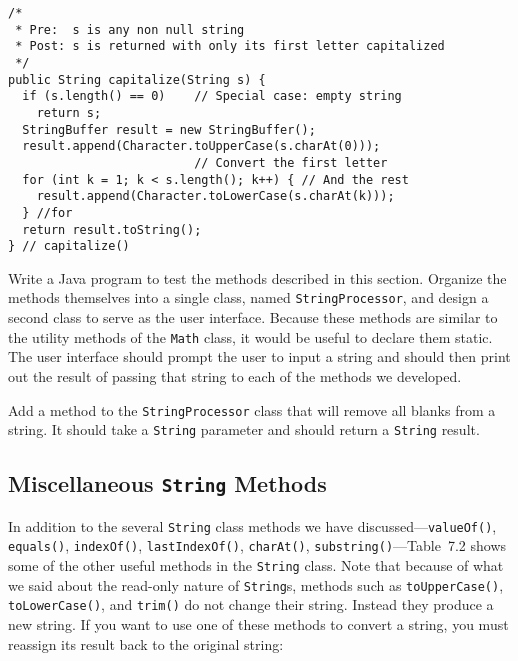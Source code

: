 \begin{jjjlisting}[27pc]
\begin{lstlisting}
/*
 * Pre:  s is any non null string
 * Post: s is returned with only its first letter capitalized
 */
public String capitalize(String s) {
  if (s.length() == 0)    // Special case: empty string
    return s;
  StringBuffer result = new StringBuffer();
  result.append(Character.toUpperCase(s.charAt(0))); 
                          // Convert the first letter
  for (int k = 1; k < s.length(); k++) { // And the rest 
    result.append(Character.toLowerCase(s.charAt(k)));
  } //for
  return result.toString();
} // capitalize()
\end{lstlisting}
\end{jjjlisting}

\begin{SSTUDY}

\item Write a Java program to test the methods described in this
section.  Organize the methods themselves into a single class, named
{\tt StringProcessor}, and design a second class to serve as the user
interface. Because these methods are similar to the utility methods of
the {\tt Math} class, it would be useful to declare them static.  The
user interface should prompt the user to input a string and should
then print out the result of passing that string to each of the
methods we developed.

\item Add a method to the {\tt StringProcessor} class that will remove
all blanks from a string.  It should take a {\tt String} parameter and
should return a {\tt String} result.

\end{SSTUDY}


\subsection{Miscellaneous {\tt String} Methods}
\noindent In addition to the several {\tt String} class methods we have
discussed---{\tt valueOf()}, {\tt equals()}, {\tt indexOf()},
{\tt lastIndexOf()}, {\tt charAt()}, {\tt substring()}---Table~7.2 
shows some of the other useful methods
in the {\tt String} class.  Note that because of what we said about
the read-only nature of {\tt String}s, methods such as {\tt toUpperCase()},
{\tt toLowerCase()}, and {\tt trim()} do not  change their string.  Instead
they produce a new string.  If you want to use one of these methods to convert
a string, you must reassign its result back to the original string:


